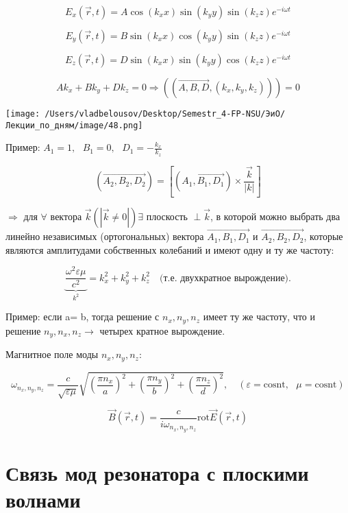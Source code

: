 \documentclass[12pt, a4paper]{report}
\begin{document}
\fi


\[ E_x (\vec{r } ,t ) = A \cos (k_x x ) \sin (k_y y ) \sin (k_z z) e^{- i \omega t}  \] 

\[ E_y (\vec{r } ,t ) = B \sin (k_x x ) \cos (k_y y ) \sin (k_z z) e^{- i \omega t} \] 

\[ E_z (\vec{r } ,t ) = D \sin (k_x x ) \sin (k_y y ) \cos (k_z z) e^{- i \omega t} \] 

\[ A k_x  + B k_y + D k_z = 0 \Rightarrow ((\overrightarrow{A,B,D}, (k_x, k_y, k_z)  )) = 0 \] 

\begin{center}
    \texttt{[image: /Users/vladbelousov/Desktop/Semestr\_4-FP-NSU/ЭиО/Лекции\_по\_дням/image/48.png]}
\end{center}

Пример: \( \displaystyle A_1 =1 , \text{ }  B_1= 0 , \text{ }  D_1 = -\frac{k_x}{k_z}  \) 

\[ (\overrightarrow{A_2,B_2, D_2}  ) = \left[ (\overrightarrow{A_1,B_1, D_1}  ) \times \frac{\vec{k} }{|k|} \right]\] 

\( \Rightarrow  \)  для \( \forall  \)  вектора \( \vec{k } (|\vec{k} \neq 0 |)  \exists \) плоскость \( \perp \vec{k}  \), в которой можно выбрать два линейно независимых (ортогональных) вектора \( \overrightarrow{A_1, B_1, D_1}   \)  и \( \overrightarrow{A_2, B_2, D_2} \), которые являются амплитудами собственных колебаний и имеют одну и ту же частоту:

\[ \displaystyle \underbrace{\frac{\omega ^2 \varepsilon \mu }{c ^2 }}_{k ^2} = k_x ^2 + k_y ^2 + k_z ^2 \quad \text{(т.е. двухкратное вырождение).}  \] 

Пример: если a= b, тогда решение с \( n_x, n_y ,n_z \)  имеет ту же частоту, что и решение \( n_y, n_x, n_z \to  \)  четырех кратное вырождение.

Магнитное поле моды \( n_x, n_y, n_z \):

\[ \omega_{ n_x, n_y ,n_z}  = \frac{c}{\sqrt{\varepsilon \mu}} \sqrt{\left( \frac{\pi n_x}{a}  \right) ^2+ \left( \frac{\pi n_y}{b}  \right) ^2+ \left( \frac{\pi n_z}{d}  \right) ^2} , \quad  (\varepsilon = \mathrm{cosnt} , \text{ } \mu = \mathrm{cosnt}  ) \] 

\[ \vec{B } (\vec{r } , t ) = \frac{c}{i \omega_{ n_x, n_y ,n_z}}  \mathrm{rot } \vec{E} (\vec{r}  ,t )  \] 

\section{Связь мод резонатора с плоскими волнами}
\end{document}
